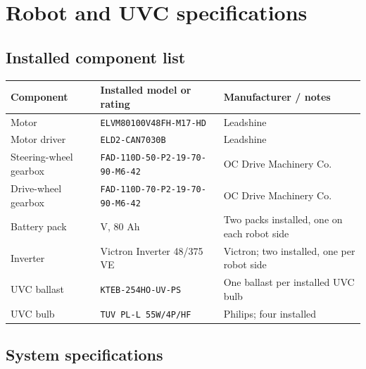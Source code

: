 \documentclass[
  10pt,
  letterpaper,
  openany]{report}
\newcounter{none} %
\begin{document}
\protect{}\label{robot-specs}
\section{Robot and UVC
specifications}\label{robot-and-uvc-specifications}

\subsection{Installed component list}\label{installed-component-list}

{\def\LTcaptype{none} %
\begin{longtable}[]{@{}
  >{\raggedright\arraybackslash}p{}
  >{\raggedright\arraybackslash}p{}
  >{\raggedright\arraybackslash}p{}@{}}
\toprule\noalign{}
\begin{minipage}[b]{\linewidth}\raggedright
Component
\end{minipage} & \begin{minipage}[b]{\linewidth}\raggedright
Installed model or rating
\end{minipage} & \begin{minipage}[b]{\linewidth}\raggedright
Manufacturer / notes
\end{minipage} \\
\midrule\noalign{}
\endhead
\bottomrule\noalign{}
\endlastfoot
Motor & \texttt{ELVM80100V48FH-M17-HD} & Leadshine \\
Motor driver & \texttt{ELD2-CAN7030B} & Leadshine \\
Steering-wheel gearbox & \texttt{FAD-110D-50-P2-19-70-90-M6-42} & OC
Drive Machinery Co. \\
Drive-wheel gearbox & \texttt{FAD-110D-70-P2-19-70-90-M6-42} & OC Drive
Machinery Co. \\
Battery pack & 48 V, 80 Ah & Two packs installed, one on each robot
side \\
Inverter & Victron Inverter 48/375 VE & Victron; two installed, one per
robot side \\
UVC ballast & \texttt{KTEB-254HO-UV-PS} & One ballast per installed UVC
bulb \\
UVC bulb & \texttt{TUV\ PL-L\ 55W/4P/HF} & Philips; four installed \\
\end{longtable}
}

\subsection{System specifications}\label{system-specifications}
\end{document}
